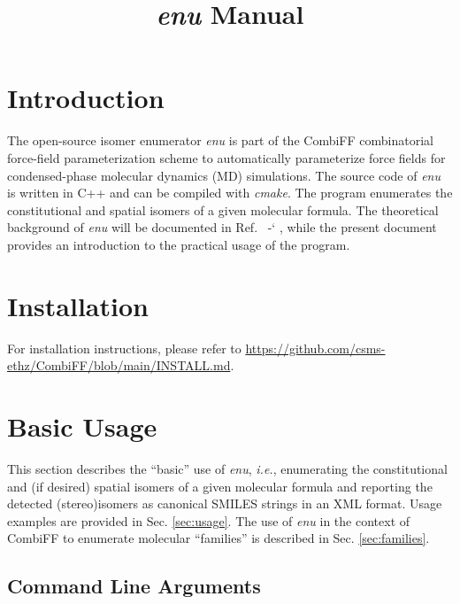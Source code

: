 \documentclass[a4paper,11pt]{article}
\title{\textit{enu} Manual}
\date{}
\newcommand*{\citen}[1]{%
  \begingroup
    \romannumeral-`\x %
    \setcitestyle{numbers}%
    \cite{#1}%
  \endgroup   
}
\begin{document}
\pagestyle{plain}
\maketitle
\tableofcontents

\clearpage

\section{Introduction}

The open-source isomer enumerator \textit{enu} is part of the CombiFF combinatorial force-field parameterization scheme to automatically parameterize force fields for condensed-phase molecular dynamics (MD) simulations.\cite{Oliveira2020,Oliveira2021} The source code of \textit{enu} is written in C++ and can be compiled with \textit{cmake}. The program enumerates the constitutional and spatial isomers of a given molecular formula. The theoretical background of \textit{enu} will be documented in Ref.~\citen{Rieder2022}, while the present document provides an introduction to the practical usage of the program.

\section{Installation}

For installation instructions, please refer to \url{https://github.com/csms-ethz/CombiFF/blob/main/INSTALL.md}.

\section{Basic Usage}

This section describes the ``basic'' use of \textit{enu}, \textit{i.e.}, enumerating the constitutional and (if desired) spatial isomers of a given molecular formula and reporting the detected (stereo)isomers as canonical SMILES strings in an XML format. Usage examples are provided in Sec. \ref{sec:usage}. The use of \textit{enu} in the context of CombiFF to enumerate molecular ``families'' is described in Sec. \ref{sec:families}.

\subsection{Command Line Arguments}
\end{document}
